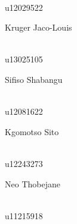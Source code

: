 \documentclass[a4paper,12pt]{report}
\begin{document}
\begin{titlepage}
\begin{center}
\begin{minipage}{0.4\textwidth}
\end{minipage}
\begin{minipage}{0.4\textwidth}
\begin{flushright} \large
\emph{} \\
u12029522
\end{flushright}
\end{minipage}
\begin{minipage}{0.4\textwidth}
\begin{flushleft} \large
Kruger {Jaco-Louis}
\end{flushleft}
\end{minipage}
\begin{minipage}{0.4\textwidth}
\begin{flushright} \large
\emph{} \\
u13025105
\end{flushright}
\end{minipage}
\begin{minipage}{0.4\textwidth}
\begin{flushleft} \large
Sifiso {Shabangu}
\end{flushleft}
\end{minipage}
\begin{minipage}{0.4\textwidth}
\begin{flushright} \large
\emph{} \\
u12081622
\end{flushright}
\end{minipage}
\begin{minipage}{0.4\textwidth}
\begin{flushleft} \large
Kgomotso {Sito}
\end{flushleft}
\end{minipage}
\begin{minipage}{0.4\textwidth}
\begin{flushright} \large
\emph{} \\
u12243273
\end{flushright}
\end{minipage}
\begin{minipage}{0.4\textwidth}
\begin{flushleft} \large
Neo {Thobejane}
\end{flushleft}
\end{minipage}
\begin{minipage}{0.4\textwidth}
\begin{flushright} \large
\emph{} \\
u11215918
\end{flushright}

\end{minipage}
\end{center}
\end{titlepage}
\end{document}
